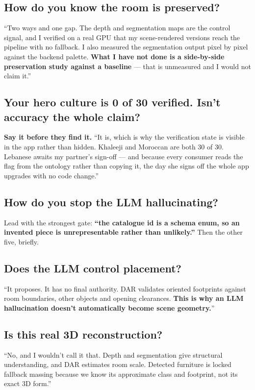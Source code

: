 \documentclass[10.5pt,a4paper]{article}
\begin{document}
\subsection*{How do you know the room is preserved?}
``Two ways and one gap. The depth and segmentation maps are the control signal, and I verified on a
real GPU that my scene-rendered versions reach the pipeline with no fallback. I also measured the
segmentation output pixel by pixel against the backend palette. \textbf{What I have not done is a
side-by-side preservation study against a baseline} --- that is unmeasured and I would not claim it.''

\subsection*{Your hero culture is 0 of 30 verified. Isn't accuracy the whole claim?}
\textbf{Say it before they find it.} ``It is, which is why the verification state is visible in the
app rather than hidden. Khaleeji and Moroccan are both 30 of 30. Lebanese awaits my partner's
sign-off --- and because every consumer reads the flag from the ontology rather than copying it, the
day she signs off the whole app upgrades with no code change.''

\subsection*{How do you stop the LLM hallucinating?}
Lead with the strongest gate: \textbf{``the catalogue id is a schema enum, so an invented piece is
unrepresentable rather than unlikely.''} Then the other five, briefly.

\subsection*{Does the LLM control placement?}
``It proposes. It has no final authority. DAR validates oriented footprints against room boundaries,
other objects and opening clearances. \textbf{This is why an LLM hallucination doesn't automatically
become scene geometry.}''

\subsection*{Is this real 3D reconstruction?}
``No, and I wouldn't call it that. Depth and segmentation give structural understanding, and DAR
estimates room scale. Detected furniture is locked fallback massing because we know its approximate
class and footprint, not its exact 3D form.''
\end{document}
